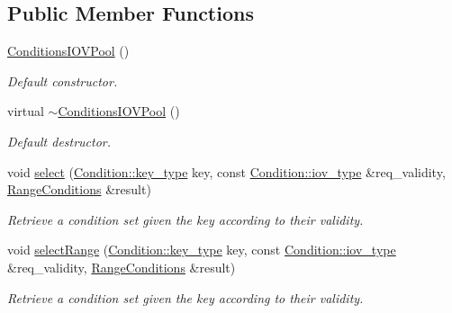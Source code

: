 \subsection*{Public Member Functions}
\begin{DoxyCompactItemize}
\item 
\hyperlink{class_d_d4hep_1_1_conditions_1_1_conditions_i_o_v_pool_a8ccf22020bacb07028aea997d172c7d0}{ConditionsIOVPool} ()
\begin{DoxyCompactList}\small\item\em Default constructor. \item\end{DoxyCompactList}\item 
virtual \hyperlink{class_d_d4hep_1_1_conditions_1_1_conditions_i_o_v_pool_a58a9a1f3f6d282fa24c00010193da303}{$\sim$ConditionsIOVPool} ()
\begin{DoxyCompactList}\small\item\em Default destructor. \item\end{DoxyCompactList}\item 
void \hyperlink{class_d_d4hep_1_1_conditions_1_1_conditions_i_o_v_pool_a75f43e7cd7cbc5c07afb0aca2b241a41}{select} (\hyperlink{class_d_d4hep_1_1_conditions_1_1_condition_a7528efa762e8cc072ef80ea67c3531f9}{Condition::key\_\-type} key, const \hyperlink{class_d_d4hep_1_1_i_o_v}{Condition::iov\_\-type} \&req\_\-validity, \hyperlink{namespace_d_d4hep_1_1_conditions_ae765f0140a33973a430280f02b6062f4}{RangeConditions} \&result)
\begin{DoxyCompactList}\small\item\em Retrieve a condition set given the key according to their validity. \item\end{DoxyCompactList}\item 
void \hyperlink{class_d_d4hep_1_1_conditions_1_1_conditions_i_o_v_pool_a09fb206aaa3c86d249598b7eaa58b322}{selectRange} (\hyperlink{class_d_d4hep_1_1_conditions_1_1_condition_a7528efa762e8cc072ef80ea67c3531f9}{Condition::key\_\-type} key, const \hyperlink{class_d_d4hep_1_1_i_o_v}{Condition::iov\_\-type} \&req\_\-validity, \hyperlink{namespace_d_d4hep_1_1_conditions_ae765f0140a33973a430280f02b6062f4}{RangeConditions} \&result)
\begin{DoxyCompactList}\small\item\em Retrieve a condition set given the key according to their validity. \item\end{DoxyCompactList}\item 

\end{DoxyCompactItemize}
